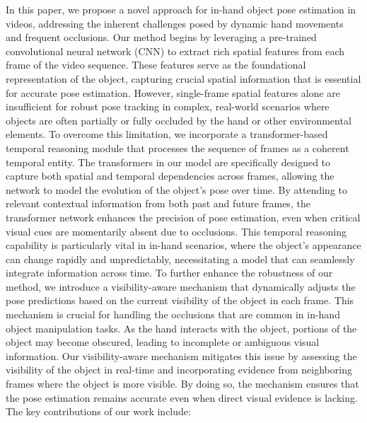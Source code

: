 In this paper, we propose a novel approach for in-hand object pose estimation in videos, addressing the inherent challenges posed by dynamic hand movements and frequent occlusions. Our method begins by leveraging a pre-trained convolutional neural network (CNN) to extract rich spatial features from each frame of the video sequence. These features serve as the foundational representation of the object, capturing crucial spatial information that is essential for accurate pose estimation. However, single-frame spatial features alone are insufficient for robust pose tracking in complex, real-world scenarios where objects are often partially or fully occluded by the hand or other environmental elements. To overcome this limitation, we incorporate a transformer-based temporal reasoning module that processes the sequence of frames as a coherent temporal entity. The transformers in our model are specifically designed to capture both spatial and temporal dependencies across frames, allowing the network to model the evolution of the object's pose over time. By attending to relevant contextual information from both past and future frames, the transformer network enhances the precision of pose estimation, even when critical visual cues are momentarily absent due to occlusions. This temporal reasoning capability is particularly vital in in-hand scenarios, where the object's appearance can change rapidly and unpredictably, necessitating a model that can seamlessly integrate information across time. To further enhance the robustness of our method, we introduce a visibility-aware mechanism that dynamically adjusts the pose predictions based on the current visibility of the object in each frame. This mechanism is crucial for handling the occlusions that are common in in-hand object manipulation tasks. As the hand interacts with the object, portions of the object may become obscured, leading to incomplete or ambiguous visual information. Our visibility-aware mechanism mitigates this issue by assessing the visibility of the object in real-time and incorporating evidence from neighboring frames where the object is more visible. By doing so, the mechanism ensures that the pose estimation remains accurate even when direct visual evidence is lacking. \\

The key contributions of our work include:

